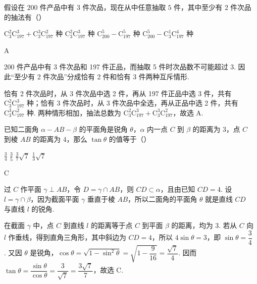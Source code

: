 \documentclass[UTF8,a4paper,oneside,11pt]{ctexbook}
\begin{document}
\begin{problem}
假设在 \(200\) 件产品中有 \(3\) 件次品，现在从中任意抽取 \(5\) 件，其中至少有 \(2\) 件次品的抽法有（\quad）

\choices
    {\(\mathrm C_3^2\mathrm C_{197}^3 + \mathrm C_3^3\mathrm C_{197}^2\) 种}
    {\(\mathrm C_3^2\mathrm C_{197}^3\) 种}
    {\(\mathrm C_{200}^5 - \mathrm C_{197}^5\) 种}
    {\(\mathrm C_{200}^5 - \mathrm C_3^1\mathrm C_{197}^4\) 种}
\end{problem}

\begin{answer}
A
\end{answer}

\begin{solution}
200 件产品中有 3 件次品和 197 件正品，而抽取 5 件时次品数不可能超过 3. 因此“至少有 2 件次品”分成恰有 2 件和恰有 3 件两种互斥情形.

恰有 2 件次品时，从 3 件次品中选 2 件，再从 197 件正品中选 3 件，共有 \(\mathrm C_3^2\mathrm C_{197}^3\) 种；恰有 3 件次品时，从 3 件次品中全选，再从正品中选 2 件，共有 \(\mathrm C_3^3\mathrm C_{197}^2\) 种. 两种情形相加，抽法总数为
\(\mathrm C_3^2\mathrm C_{197}^3+\mathrm C_3^3\mathrm C_{197}^2\)，故选 A.
\end{solution}

\begin{problem}
已知二面角 \(\alpha-AB-\beta\) 的平面角是锐角 \(\theta\)，\(\alpha\) 内一点 \(C\) 到 \(\beta\) 的距离为 \(3\)，点 \(C\) 到棱 \(AB\) 的距离为 \(4\)，那么 \(\tan\theta\) 的值等于（\quad）

\choices
    {\(\frac{3}{4}\)}
    {\(\frac{3}{5}\)}
    {\(\frac{3}{7}\sqrt{7}\)}
    {\(\frac{1}{3}\sqrt{7}\)}
\end{problem}

\begin{answer}
C
\end{answer}

\begin{solution}
过 \(C\) 作平面 \(\gamma\perp AB\)，令 \(D=\gamma\cap AB\)，则 \(CD\subset\alpha\)，且由已知 \(CD=4\). 设 \(l=\gamma\cap\beta\)，因为截面平面 \(\gamma\) 垂直于棱 \(AB\)，所以二面角的平面角 \(\theta\) 就是直线 \(CD\) 与直线 \(l\) 的锐角.

在截面 \(\gamma\) 中，点 \(C\) 到直线 \(l\) 的距离等于点 \(C\) 到平面 \(\beta\) 的距离，均为 \(3\). 若从 \(C\) 向 \(l\) 作垂线，得到直角三角形，其中斜边为 \(CD=4\)，所以
\(4\sin\theta=3\)，即 \(\sin\theta=\dfrac34\). 又因 \(\theta\) 是锐角，\(\cos\theta=\sqrt{1-\sin^2\theta}=\sqrt{1-\dfrac9{16}}=\dfrac{\sqrt7}{4}\). 因而
\(\tan\theta=\dfrac{\sin\theta}{\cos\theta}=\dfrac{3}{\sqrt7}=\dfrac{3\sqrt7}{7}\)，故选 C.
\end{solution}
\end{document}
